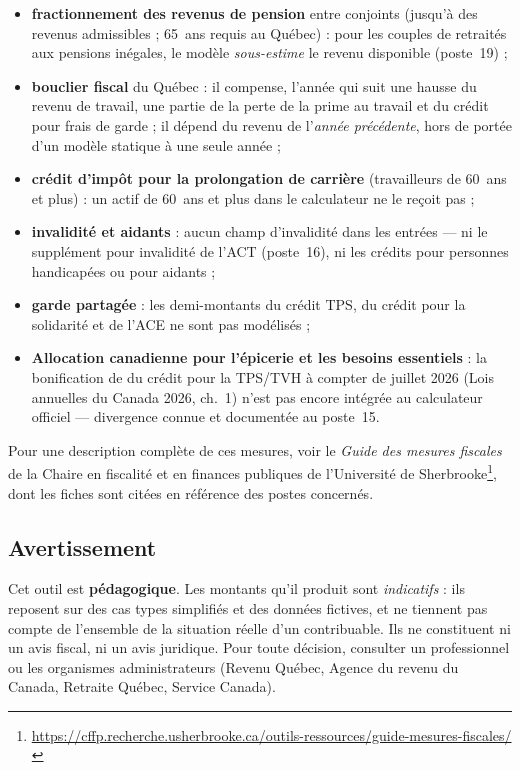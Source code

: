 \begin{itemize}
  \item \textbf{fractionnement des revenus de pension} entre conjoints
        (jusqu'à  des revenus admissibles ; 65~ans requis au
        Québec) : pour les couples de retraités aux pensions inégales, le
        modèle \emph{sous-estime} le revenu disponible (poste~19) ;
  \item \textbf{bouclier fiscal} du Québec : il compense, l'année qui suit
        une hausse du revenu de travail, une partie de la perte de la
        prime au travail et du crédit pour frais de garde ; il dépend du
        revenu de l'\emph{année précédente}, hors de portée d'un modèle
        statique à une seule année ;
  \item \textbf{crédit d'impôt pour la prolongation de carrière}
        (travailleurs de 60~ans et plus) : un actif de 60~ans et plus dans
        le calculateur ne le reçoit pas ;
  \item \textbf{invalidité et aidants} : aucun champ d'invalidité dans les
        entrées --- ni le supplément pour invalidité de l'ACT (poste~16),
        ni les crédits pour personnes handicapées ou pour aidants ;
  \item \textbf{garde partagée} : les demi-montants du crédit TPS, du
        crédit pour la solidarité et de l'ACE ne sont pas modélisés ;
  \item \textbf{Allocation canadienne pour l'épicerie et les besoins
        essentiels} : la bonification de  du crédit pour la TPS/TVH
        à compter de juillet 2026 (Lois annuelles du Canada 2026, ch.~1)
        n'est pas encore intégrée au calculateur officiel --- divergence
        connue et documentée au poste~15.
\end{itemize}

Pour une description complète de ces mesures, voir le \emph{Guide des
mesures fiscales} de la Chaire en fiscalité et en finances publiques de
l'Université de Sherbrooke\footnote{\url{https://cffp.recherche.usherbrooke.ca/outils-ressources/guide-mesures-fiscales/}},
dont les fiches sont citées en référence des postes concernés.

\subsection{Avertissement}

Cet outil est \textbf{pédagogique}. Les montants qu'il produit sont
\emph{indicatifs} : ils reposent sur des cas types simplifiés et des
données fictives, et ne tiennent pas compte de l'ensemble de la situation
réelle d'un contribuable. Ils ne constituent ni un avis fiscal, ni un avis
juridique. Pour toute décision, consulter un professionnel ou les
organismes administrateurs (Revenu Québec, Agence du revenu du Canada,
Retraite Québec, Service Canada).

